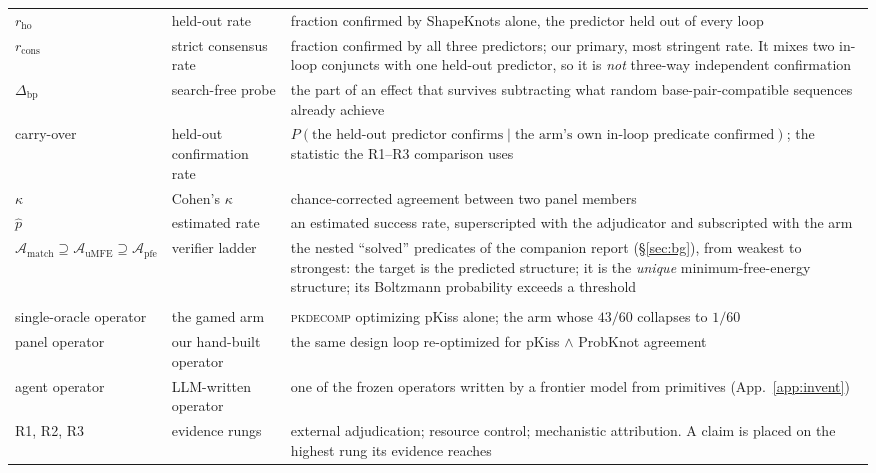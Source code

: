 \documentclass[11pt]{article}
\newcommand{\match}{\ensuremath{\mathcal{A}_{\mathrm{match}}}}
\newcommand{\umfe}{\ensuremath{\mathcal{A}_{\mathrm{uMFE}}}}
\newcommand{\pfe}{\ensuremath{\mathcal{A}_{\mathrm{pfe}}}}
\begin{document}
\begin{xltabular}{\linewidth}{@{}>{\raggedright\arraybackslash}p{2.35cm}>{\raggedright\arraybackslash}p{3.3cm}L@{}}
$r_{\mathrm{ho}}$ & held-out rate & fraction confirmed by ShapeKnots alone, the predictor held out of every loop\\
$r_{\mathrm{cons}}$ & strict consensus rate & fraction confirmed by all three predictors; our primary, most stringent rate. It mixes two in-loop conjuncts with one held-out predictor, so it is \emph{not} three-way independent confirmation\\
$\Delta_{\mathrm{bp}}$ & search-free probe & the part of an effect that survives subtracting what random base-pair-compatible sequences already achieve\\
carry-over & held-out confirmation rate & $P(\text{the held-out predictor confirms}\mid\text{the arm's own in-loop predicate confirmed})$; the statistic the R1--R3 comparison uses\\
$\kappa$ & Cohen's $\kappa$ & chance-corrected agreement between two panel members\\
$\widehat p$ & estimated rate & an estimated success rate, superscripted with the adjudicator and subscripted with the arm\\
$\match\supseteq\umfe\supseteq\pfe$ & verifier ladder & the nested ``solved'' predicates of the companion report (\S\ref{sec:bg}), from weakest to strongest: the target is the predicted structure; it is the \emph{unique} minimum-free-energy structure; its Boltzmann probability exceeds a threshold\\
\addlinespace[3pt]
\\
\addlinespace[2pt]
single-oracle operator & the gamed arm & \textsc{pkdecomp} optimizing pKiss alone; the arm whose $43/60$ collapses to $1/60$\\
panel operator & our hand-built operator & the same design loop re-optimized for pKiss $\wedge$ ProbKnot agreement\\
agent operator & LLM-written operator & one of the frozen operators written by a frontier model from primitives (App.~\ref{app:invent})\\
R1, R2, R3 & evidence rungs & external adjudication; resource control; mechanistic attribution. A claim is placed on the highest rung its evidence reaches\\
\bottomrule
\end{xltabular}
\par\endgroup
\medskip
\end{document}
